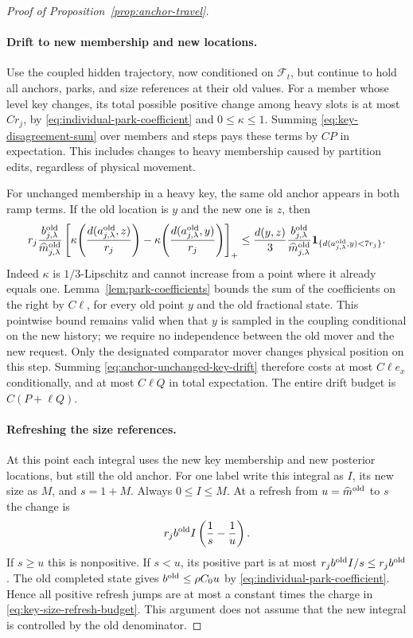 \begin{proof}[Proof of Proposition~\ref{prop:anchor-travel}]
\paragraph{Drift to new membership and new locations.}
Use the coupled hidden trajectory, now conditioned on $\mathcal F_t$,
but continue to hold all anchors, parks, and size references at their
old values.  For a member whose level key changes, its total possible
positive change among heavy slots is at most $C r_j$, by
\eqref{eq:individual-park-coefficient} and $0\le\kappa\le1$.
Summing \eqref{eq:key-disagreement-sum} over members and steps pays
these terms by $CP$ in expectation.  This includes changes to heavy
membership caused by partition edits, regardless of physical movement.

For unchanged membership in a heavy key, the same old anchor appears
in both ramp terms.  If the old location is $y$ and the new one is $z$,
then
\begin{equation}\label{eq:anchor-unchanged-key-drift}
 r_j\frac{b^{\rm old}_{j,\lambda}}{\widehat m^{\rm old}_{j,\lambda}}
 \left[\kappa\!\left(\frac{d(a^{\rm old}_{j,\lambda},z)}{r_j}\right)
       -\kappa\!\left(\frac{d(a^{\rm old}_{j,\lambda},y)}{r_j}\right)
 \right]_+
 \le\frac{d(y,z)}3
       \frac{b^{\rm old}_{j,\lambda}}{\widehat m^{\rm old}_{j,\lambda}}
       \mathbf 1_{\{d(a^{\rm old}_{j,\lambda},y)<7r_j\}}.
\end{equation}
Indeed $\kappa$ is $1/3$-Lipschitz and cannot increase from a point where
it already equals one.  Lemma~\ref{lem:park-coefficients} bounds the
sum of the coefficients on the right by $C\ell$, for every old point
$y$ and the old fractional state.  This pointwise bound remains valid
when that $y$ is sampled in the coupling conditional on the new history;
we require no independence between the old mover and the new request.
Only the designated comparator mover changes physical position on this
step.  Summing \eqref{eq:anchor-unchanged-key-drift} therefore costs at
most $C\ell e_x$ conditionally, and at most $C\ell Q$ in total
expectation.  The entire drift budget is $C(P+\ell Q)$.

\paragraph{Refreshing the size references.}
At this point each integral uses the new key membership and new
posterior locations, but still the old anchor.  For one label write
this integral as $I$, its new size as $M$, and $s=1+M$.  Always
$0\le I\le M$.  At a refresh from $u=\widehat m^{\rm old}$ to $s$ the
change is
\[
 r_j b^{\rm old}I\left(\frac1s-\frac1u\right).
\]
If $s\ge u$ this is nonpositive.  If $s<u$, its positive part is at
most $r_jb^{\rm old}I/s\le r_jb^{\rm old}$.  The old completed state
gives $b^{\rm old}\le\rho C_0 u$ by
\eqref{eq:individual-park-coefficient}.  Hence all positive refresh
jumps are at most a constant times the charge in
\eqref{eq:key-size-refresh-budget}.  This argument does not assume that
the new integral is controlled by the old denominator.


\end{proof}
